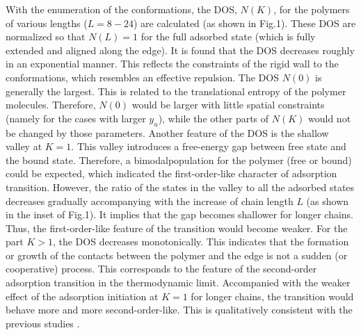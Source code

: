 \documentclass[aps,pre,twocolumn,showpacs,preprintnumbers,amsmath,amssymb]{revtex4-1}
\begin{document}
With the enumeration of the conformations, the DOS, $N(K)$, for
the polymers of various lengths ($L=8-24$) are calculated (as
shown in Fig.1). These DOS are normalized so that $N(L)=1$ for
the full adsorbed state (which is fully extended and aligned
along the edge). It is found that the DOS decreases roughly in
an exponential manner. This reflects the constraints of the
rigid wall to the conformations, which resembles an effective
repulsion. The DOS $N(0)$ is generally the largest. This is
related to the translational entropy of the polymer molecules.
Therefore, $N(0)$ would be larger with little spatial
constraints (namely for the cases with larger $y_u$), while the
other parts of $N(K)$ would not be changed by those parameters.
Another feature of the DOS is the shallow valley at $K=1$. This
valley introduces a free-energy gap between free state and the
bound state. Therefore, a bimodalpopulation for the polymer
(free or bound) could be expected, which indicated the
first-order-like character of adsorption transition. However,
the ratio of the states in the valley to all the adsorbed states
decreases gradually accompanying with the increase of chain
length $L$ (as shown in the inset of Fig.1). It implies that the
gap becomes shallower for longer chains. Thus, the
first-order-like feature of the transition would become weaker.
For the part $K>1$, the DOS decreases monotonically. This
indicates that the formation or growth of the contacts between
the polymer and the edge is not a sudden (or cooperative)
process. This corresponds to the feature of the second-order
adsorption transition in the thermodynamic limit. Accompanied
with the weaker effect of the adsorption initiation at $K=1$ for
longer chains, the transition would behave more and more
second-order-like. This is qualitatively consistent with the
previous studies \cite{PCCP10,JCP09,JCP09b}.
\end{document}
